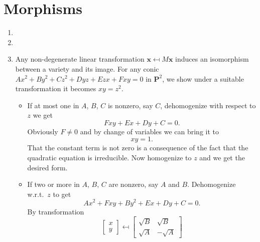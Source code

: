 \documentclass{note}
\newcommand{\Proj}[1]{\mathbf{P}^{#1}}
\begin{document}
\section{Morphisms}


\Ex
\begin{enumerate}
  \item
  \item
  \item Any non-degenerate linear transformation
        $\mathbf{x} \mapsfrom M\mathbf{x}$ induces an isomorphism between a
        variety and its image. For any conic $Ax^2 + By^2 + Cz^2 + Dyz + Ezx + Fxy = 0$
        in $\Proj{2}$, we show under a suitable transformation it becomes $xy = z^2$.
        \begin{itemize}
          \item If at most one in $A$, $B$, $C$ is nonzero, say $C$,
                dehomogenize with respect to $z$ we get
                \begin{equation*}
                  Fxy + Ex + Dy + C = 0.
                \end{equation*}
                Obviously $F \ne 0$ and by change of variables we can bring it to
                \begin{equation*}
                  xy = 1.
                \end{equation*}
                That the constant term is not zero is a consequence of the fact that the
                quadratic equation is irreducible. Now homogenize to $z$ and we get the desired
                form.
          \item If two or more in $A$, $B$, $C$ are nonzero, say $A$ and $B$.
                Dehomogenize w.r.t.~$z$ to get
                \begin{equation*}
                  Ax^2 + Fxy + By^2 + Ex + Dy + C = 0.
                \end{equation*}
                By transformation
                \begin{equation*}
                  \begin{bmatrix}
                    x \\ y
                  \end{bmatrix}
                  \mapsfrom
                  \begin{bmatrix}
                    \sqrt{B} & \sqrt{B}  \\
                    \sqrt{A} & -\sqrt{A}


\end{bmatrix}
\end{equation*}
\end{itemize}
\end{enumerate}
\end{document}
